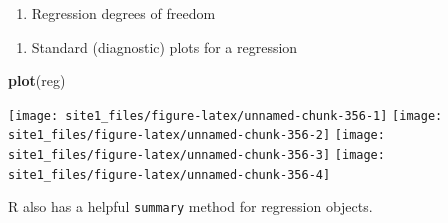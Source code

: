 \documentclass[]{book}
\newenvironment{Shaded}{\begin{snugshade}}{\end{snugshade}}
\newcommand{\KeywordTok}[1]{\textcolor[rgb]{0.13,0.29,0.53}{\textbf{#1}}}
\newcommand{\CommentTok}[1]{\textcolor[rgb]{0.56,0.35,0.01}{\textit{#1}}}
\newcommand{\OperatorTok}[1]{\textcolor[rgb]{0.81,0.36,0.00}{\textbf{#1}}}
\newcommand{\NormalTok}[1]{#1}
\providecommand{\tightlist}{%
  \setlength{\itemsep}{0pt}\setlength{\parskip}{0pt}}
\begin{document}
\begin{enumerate}
\def\labelenumi{\arabic{enumi}.}
\setcounter{enumi}{2}
\tightlist
\item
  Regression degrees of freedom
\end{enumerate}

\begin{Shaded}
\end{Shaded}

\begin{enumerate}
\def\labelenumi{\arabic{enumi}.}
\setcounter{enumi}{3}
\tightlist
\item
  Standard (diagnostic) plots for a regression
\end{enumerate}

\begin{Shaded}
\begin{Highlighting}[]
\KeywordTok{plot}\NormalTok{(reg)}
\end{Highlighting}
\end{Shaded}

\begin{center}\texttt{[image: site1\_files/figure-latex/unnamed-chunk-356-1]} \texttt{[image: site1\_files/figure-latex/unnamed-chunk-356-2]} \texttt{[image: site1\_files/figure-latex/unnamed-chunk-356-3]} \texttt{[image: site1\_files/figure-latex/unnamed-chunk-356-4]} \end{center}

R also has a helpful \texttt{summary} method for regression objects.
\end{document}
